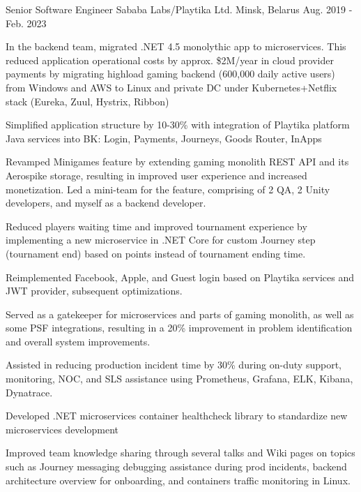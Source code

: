 \begin{cventries}
  \cventry
    {Senior Software Engineer} %
    {Sababa Labs/Playtika Ltd.} %
    {Minsk, Belarus} %
    {Aug. 2019 - Feb. 2023} %
    {
      \begin{cvitems} %
        \item {In the backend team, migrated .NET 4.5 monolythic app to microservices. This reduced application operational costs by approx. \$2M/year in cloud provider payments by migrating highload gaming backend (600,000 daily active users) from Windows and AWS to Linux and private DC under Kubernetes+Netflix stack (Eureka, Zuul, Hystrix, Ribbon)}
        \item {Simplified application structure by 10-30\% with integration of Playtika platform Java services into BK: Login, Payments, Journeys, Goods Router, InApps}
        \item {Revamped Minigames feature by extending gaming monolith REST API and its Aerospike storage, resulting in improved user experience and increased monetization. Led a mini-team for the feature, comprising of 2 QA, 2 Unity developers, and myself as a backend developer.}
        \item {Reduced players waiting time and improved tournament experience by implementing a new microservice in .NET Core for custom Journey step (tournament end) based on points instead of tournament ending time.}
        \item {Reimplemented Facebook, Apple, and Guest login based on Playtika services and JWT provider, subsequent optimizations.}
        \item {Served as a gatekeeper for microservices and parts of gaming monolith, as well as some PSF integrations, resulting in a 20\% improvement in problem identification and overall system improvements.}
        \item {Assisted in reducing production incident time by 30\% during on-duty support, monitoring, NOC, and SLS assistance using Prometheus, Grafana, ELK, Kibana, Dynatrace.}
        \item {Developed .NET microservices container healthcheck library to standardize new microservices development}
        \item {Improved team knowledge sharing through several talks and Wiki pages on topics such as Journey messaging debugging assistance during prod incidents, backend architecture overview for onboarding, and containers traffic monitoring in Linux.}
      \end{cvitems}
    }


\end{cventries}
